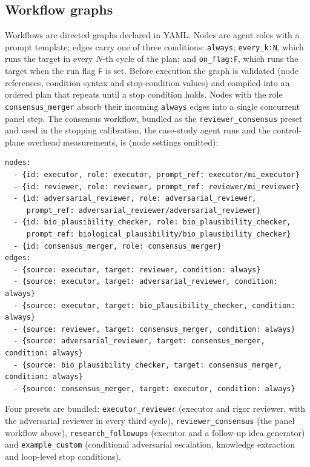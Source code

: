 \documentclass[10pt,letterpaper]{article}
\begin{document}
\subsection*{Workflow graphs}

Workflows are directed graphs declared in YAML. Nodes are agent roles with a prompt template; edges carry one of three conditions: \texttt{always}; \texttt{every\_k:N}, which runs the target in every $N$-th cycle of the plan; and \texttt{on\_flag:F}, which runs the target when the run flag \texttt{F} is set. Before execution the graph is validated (node references, condition syntax and stop-condition values) and compiled into an ordered plan that repeats until a stop condition holds. Nodes with the role \texttt{consensus\_merger} absorb their incoming \texttt{always} edges into a single concurrent panel step. The consensus workflow, bundled as the \texttt{reviewer\_consensus} preset and used in the stopping calibration, the case-study agent runs and the control-plane overhead measurements, is (node settings omitted):

\begin{lstlisting}
nodes:
  - {id: executor, role: executor, prompt_ref: executor/mi_executor}
  - {id: reviewer, role: reviewer, prompt_ref: reviewer/mi_reviewer}
  - {id: adversarial_reviewer, role: adversarial_reviewer,
     prompt_ref: adversarial_reviewer/adversarial_reviewer}
  - {id: bio_plausibility_checker, role: bio_plausibility_checker,
     prompt_ref: biological_plausibility/bio_plausibility_checker}
  - {id: consensus_merger, role: consensus_merger}
edges:
  - {source: executor, target: reviewer, condition: always}
  - {source: executor, target: adversarial_reviewer, condition: always}
  - {source: executor, target: bio_plausibility_checker, condition: always}
  - {source: reviewer, target: consensus_merger, condition: always}
  - {source: adversarial_reviewer, target: consensus_merger, condition: always}
  - {source: bio_plausibility_checker, target: consensus_merger, condition: always}
  - {source: consensus_merger, target: executor, condition: always}
\end{lstlisting}

Four presets are bundled: \texttt{executor\_reviewer} (executor and rigor reviewer, with the adversarial reviewer in every third cycle), \texttt{reviewer\_consensus} (the panel workflow above), \texttt{research\_followups} (executor and a follow-up idea generator) and \texttt{example\_custom} (conditional adversarial escalation, knowledge extraction and loop-level stop conditions).
\end{document}
